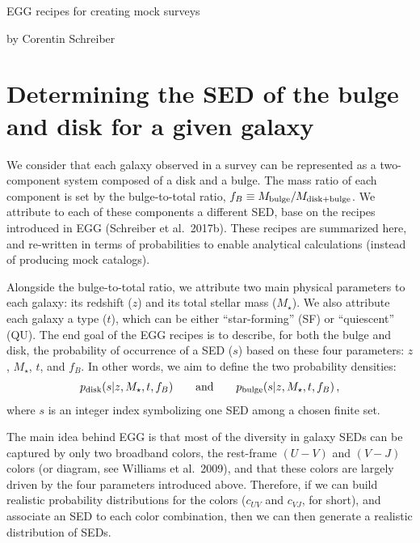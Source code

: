 \documentclass[11pt,a4paper]{article}
\newcommand{\mstar}{M_\star}
\newcommand{\uvj}{\text{\it UVJ}\xspace}
\numberwithin{equation}{section}
\begin{document}
{\centering
{\Huge EGG recipes for creating mock surveys}

\centering by Corentin Schreiber\par
}


\section{Determining the SED of the bulge and disk for a given galaxy}

We consider that each galaxy observed in a survey can be represented as a two-component system composed of a disk and a bulge. The mass ratio of each component is set by the bulge-to-total ratio, $f_B \equiv M_{\rm bulge}/M_{\rm disk+bulge}$. We attribute to each of these components a different SED, base on the recipes introduced in EGG (Schreiber et al.~2017b). These recipes are summarized here, and re-written in terms of probabilities to enable analytical calculations (instead of producing mock catalogs).

Alongside the bulge-to-total ratio, we attribute two main physical parameters to each galaxy: its redshift ($z$) and its total stellar mass ($\mstar$). We also attribute each galaxy a type ($t$), which can be either ``star-forming'' (SF) or ``quiescent'' (QU). The end goal of the EGG recipes is to describe, for both the bulge and disk, the probability of occurrence of a SED ($s$) based on these four parameters: $z$, $\mstar$, $t$, and $f_B$. In other words, we aim to define the two probability densities:
\begin{align}
p_{\rm disk}(s | z, \mstar, t, f_B) \quad\quad\text{and}\quad\quad p_{\rm bulge}(s | z, \mstar, t, f_B)\,,
\end{align}
where $s$ is an integer index symbolizing one SED among a chosen finite set.

The main idea behind EGG is that most of the diversity in galaxy SEDs can be captured by only two broadband colors, the rest-frame $(U-V)$ and $(V-J)$ colors (or \uvj diagram, see Williams et al.~2009), and that these colors are largely driven by the four parameters introduced above. Therefore, if we can build realistic probability distributions for the colors ($c_{UV}$ and $c_{V\!J}$, for short), and associate an SED to each color combination, then we can then generate a realistic distribution of SEDs.
\end{document}
